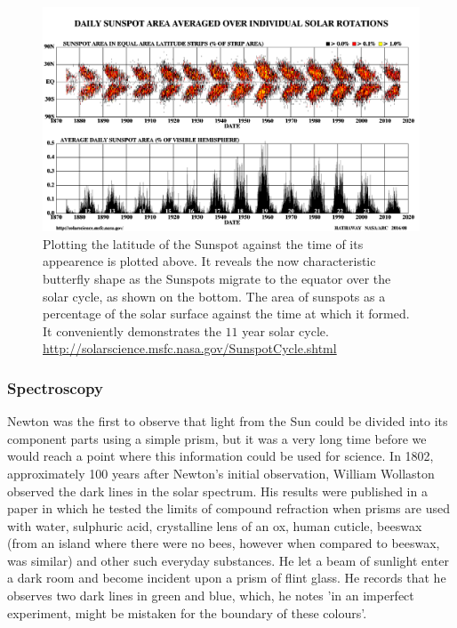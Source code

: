 \begin{figure}
	\centering
	\includegraphics[width=\linewidth]{Chapter1/Figs/bfly}
	\caption{Plotting the latitude of the Sunspot against the time of its appearence is plotted above. It reveals the now characteristic butterfly shape as the Sunspots migrate to the equator over the solar cycle, as shown on the bottom. The area of sunspots as a percentage of the solar surface against the time at which it formed. It conveniently demonstrates the $11$ year solar cycle. 
	\url{http://solarscience.msfc.nasa.gov/SunspotCycle.shtml}}
	\label{fig:sunspot_count}
\end{figure}

\subsubsection{Spectroscopy}

Newton was the first to observe that light from the Sun could be divided into its component parts using a simple prism, but it was a very long time before we would reach a point where this information could be used for science.
In 1802, approximately 100 years after Newton's initial observation, William Wollaston observed the dark lines in the solar spectrum.
His results were published in a paper in which he tested the limits of compound refraction when prisms are used with water, sulphuric acid, crystalline lens of an ox, human cuticle, beeswax (from an island where there were no bees, however when compared to beeswax, was similar) and other such everyday substances.
He let a beam of sunlight enter a dark room and become incident upon a prism of flint glass.
He records that he observes two dark lines in green and blue, which, he notes 'in an imperfect experiment, might be mistaken for the boundary of these colours'.

